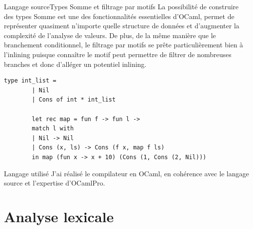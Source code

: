 \documentclass{beamer}
\begin{document}
\begin{frame}[fragile]{Langage source}{Types Somme et filtrage par motifs}
    La possibilité de construire des types Somme est une des fonctionnalités essentielles d'OCaml, permet de représenter quasiment n'importe quelle structure de données et d'augmenter la complexité de l'analyse de valeurs. De plus, de la même manière que le branchement conditionnel, le filtrage par motifs se prête particulièrement bien à l'inlining puisque connaître le motif peut permettre de filtrer de nombreuses branches et donc d'alléger un potentiel inlining.
    \begin{lstlisting}[language=caml]
        type int_list =
        | Nil
        | Cons of int * int_list

        let rec map = fun f -> fun l ->
        match l with
        | Nil -> Nil
        | Cons (x, ls) -> Cons (f x, map f ls)
        in map (fun x -> x + 10) (Cons (1, Cons (2, Nil)))
    \end{lstlisting}
\end{frame}

\begin{frame}{Langage utilisé}
    J'ai réalisé le compilateur en OCaml, en cohérence avec le langage source et l'expertise d'OCamlPro.
\end{frame}


\section{Analyse lexicale}

\end{document}
